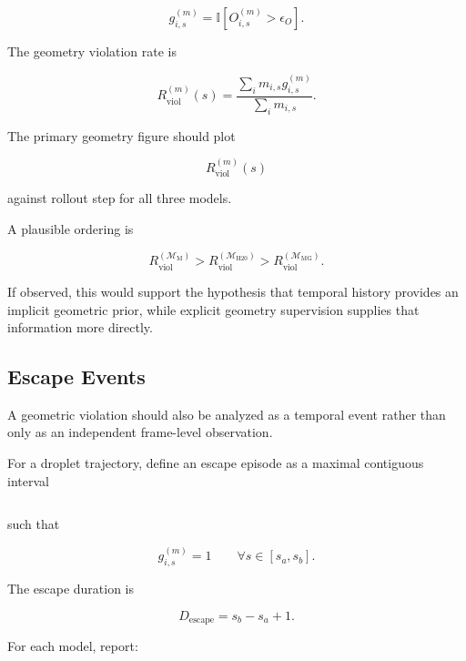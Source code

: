\documentclass[11pt]{article}
\newcommand{\Mhist}{\mathcal{M}_{\mathrm{H20}}}
\newcommand{\Mmark}{\mathcal{M}_{\mathrm{M}}}
\newcommand{\Mgeom}{\mathcal{M}_{\mathrm{MG}}}
\begin{document}
\begin{equation}
g_{i,s}^{(m)}
=
\mathbb{I}
\left[
O_{i,s}^{(m)}
>
\epsilon_O
\right].
\end{equation}

The geometry violation rate is

\begin{equation}
R_{\mathrm{viol}}^{(m)}(s)
=
\frac{
\sum_i m_{i,s}
g_{i,s}^{(m)}
}{
\sum_i m_{i,s}
}.
\end{equation}

The primary geometry figure should plot

\begin{equation}
R_{\mathrm{viol}}^{(m)}(s)
\end{equation}

against rollout step for all three models.

A plausible ordering is

\begin{equation}
R_{\mathrm{viol}}^{(\Mmark)}
>
R_{\mathrm{viol}}^{(\Mhist)}
>
R_{\mathrm{viol}}^{(\Mgeom)}.
\end{equation}

If observed, this would support the hypothesis that temporal history provides an implicit geometric prior, while explicit geometry supervision supplies that information more directly.

\subsection{Escape Events}

A geometric violation should also be analyzed as a temporal event rather than only as an independent frame-level observation.

For a droplet trajectory, define an escape episode as a maximal contiguous interval

\begin{equation}
[s_a,s_b]
\end{equation}

such that

\begin{equation}
g_{i,s}^{(m)}=1
\qquad
\forall s\in[s_a,s_b].
\end{equation}

The escape duration is

\begin{equation}
D_{\mathrm{escape}}
=
s_b-s_a+1.
\end{equation}

For each model, report:
\end{document}
